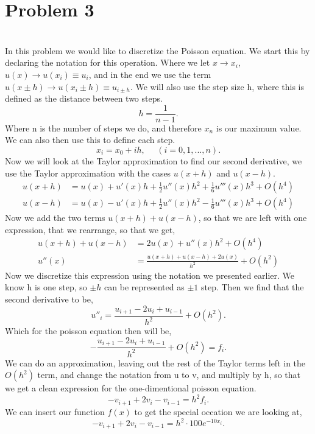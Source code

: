 \documentclass[english,notitlepage]{revtex4-1}  %
\begin{document}
 \section*{Problem 3}\
 \\
In this problem we would like to discretize the Poisson equation. We start this by declaring the notation for this operation. Where we let $x \rightarrow x_i$, $u(x) \rightarrow u(x_i) \equiv u_i$, and in the end we use the term $u(x \pm h) \rightarrow u(x_i \pm h) \equiv u_{i \pm h} $. We will also use the step size h, where this is defined as the distance between two steps.
  \begin{equation}
h = \frac{1}{n - 1}.
 \end{equation}
 Where n is the number of steps we do, and therefore $x_n$ is our maximum value. We can also then use this to define each step.
  \begin{equation}
x_i = x_0 + ih, \ \ \ \ \ \ (i = 0,1, ..., n).
 \end{equation}
 Now we will look at the Taylor approximation to find our second derivative, we use the Taylor approximation with the cases $u(x + h)$ and $u(x - h)$.
 \begin{align*}
u(x + h) &= u(x) + u'(x)h + \frac{1}{2} u''(x)h^2 + \frac{1}{6} u'''(x)h^3 + O(h^4) \\
u(x - h) &= u(x) - u'(x)h + \frac{1}{2} u''(x)h^2 - \frac{1}{6} u'''(x)h^3 + O(h^4)
 \end{align*}
 Now we add the two terms $u(x + h) + u(x - h)$, so that we are left with one expression, that we rearrange, so that we get,
 \begin{align*}
u(x + h) + u(x - h) &= 2u(x) + u''(x)h^2 + O(h^4) \\
u''(x) &= \frac{u(x + h) + u(x - h) + 2 u(x)}{h^2} + O(h^2)
 \end{align*}
Now we discretize this expression using the notation we presented earlier. We know h is one step, so $\pm h$ can be represented as $\pm 1$ step. Then we find that the second derivative to be,
\begin{equation}
u''_i = \frac{u_{i +1} - 2u_i + u_{i - 1}}{h^2} + O(h^2).
\end{equation}
Which for the poisson equation then will be,
\begin{equation}
-\frac{u_{i +1} - 2u_i + u_{i - 1}}{h^2} + O(h^2) = f_i.
\end{equation}
We can do an approximation, leaving out the rest of the Taylor terms left in the $O(h^2)$ term, and change the notation from u to v, and multiply by h, so that we get a clean expression for the one-dimentional poisson equation.
\begin{equation}
-v_{i +1} + 2v_i - v_{i - 1} = h^2 f_i.
\end{equation}
We can insert our function $f(x)$ to get the special occation we are looking at,
\begin{equation}
-v_{i +1} + 2v_i - v_{i - 1} = h^2 \cdot 100 e^{-10x_i}.
\end{equation}
\end{document}
